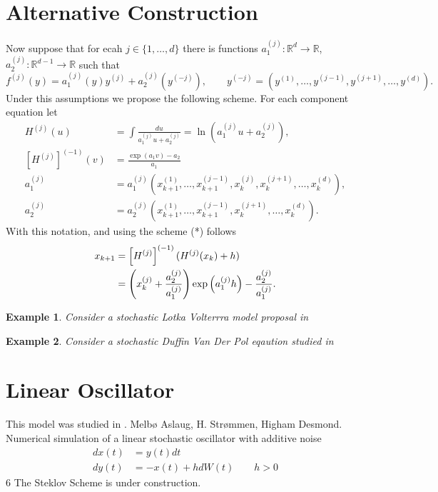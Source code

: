 \documentclass[review]{elsarticle}
\newtheorem{example}{\bf Example}[section]
\begin{document}
	\section{Alternative Construction}
		Now suppose that for ecah $j \in \{1, \dots, d \}$ there is functions 
		$a_1^{(j)}:\mathbb{R}^{d} \to \mathbb{R}$,\qquad 
		$a_2^{(j)}:\mathbb{R}^{d-1} \to \mathbb{R}$ such that 
		$$
			f^{(j)}(y) = a_1^{(j)}(y)y^{(j)} + a_2^{(j)}(y^{(-j)}), \qquad
			y^{(-j)} = (y^{(1)}, \dots ,y^{(j-1)}, y^{(j+1)}, \dots, y^{(d)}).
		$$
		Under this assumptions we propose the following scheme. For each component equation let
		\begin{align*}
			H^{(j)}(u)	&= \int \frac{du}{a_1^{(j)} u + a_2^{(j)}} 
				= \ln \left( a_1^{(j)} u + a_2^{(j)} \right),\\
			\left[H^{(j)}\right]^{(-1)} (v) & = \frac{\exp(a_1 v ) - a_2}{a_1}\\
			a_1^{(j)} &=
				a_1^{(j)}
					\left(
						x^{(1)}_{k+1}, \dots, x^{(j-1)}_{k+1},
						x^{(j)}_{k} , x^{(j+1)}_{k},\dots,x^{(d)}_{k}
					\right),
					\\
			a_2^{(j)} &=
				a_2^{(j)}
					\left(
						x^{(1)}_{k+1}, \dots, x^{(j-1)}_{k+1},
						x^{(j+1)}_{k},\dots,x^{(d)}_{k}
					\right).
		\end{align*}
		With this notation, and using the scheme (*) follows
		\begin{align}
			x_{k+1} &= \left[ H^{(j)}\right ]^{(-1)} ( H^{(j)}(x_k) + h ) \notag	\\
					&=
					\left(
						x_k^{(j)} + 
						\frac{a_2^{(j)}}{a_1^{(j)}}
					\right) 
					\exp\left(
							a_1^{(j)}h
						\right) -\frac{a_2^{(j)}}{a_1^{(j)}}.
		\end{align}
		\begin{example}
			Consider a stochastic Lotka Volterrra model proposal in \cite{Arnold1979}
		\end{example}
		\begin{example}
			Consider a stochastic Duffin Van Der Pol eqaution studied in \cite{Schenk-Hoppe1996a}
		\end{example}
	\section{Linear Oscillator}
		This model was studied in \cite{Melbo2004}.
		Melbø Aslaug, H. Strømmen, Higham Desmond. 
		Numerical simulation of a linear stochastic oscillator with additive noise
			\begin{align}
				dx(t) &= y(t)dt\\
				dy(t) &= -x(t)+h dW(t) \qquad h>0
			\end{align}6
		The Steklov Scheme is under construction.
	
\end{document}
